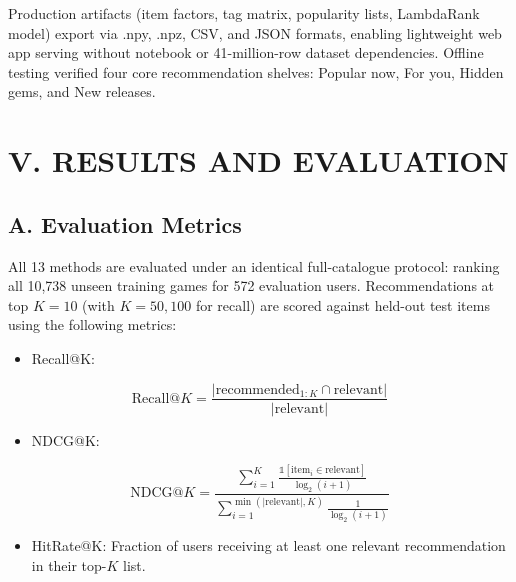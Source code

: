 \documentclass[conference]{IEEEtran}
\begin{document}
Production artifacts (item factors, tag matrix, popularity lists, LambdaRank model) export via .npy, .npz, CSV, and JSON formats, enabling lightweight web app serving without notebook or 41-million-row dataset dependencies. Offline testing verified four core recommendation shelves: Popular now, For you, Hidden gems, and New releases.

\section*{V. RESULTS AND EVALUATION}

\subsection*{A. Evaluation Metrics}

All 13 methods are evaluated under an identical full-catalogue protocol: ranking all 10,738 unseen training games for 572 evaluation users. Recommendations at top $K=10$ (with $K=50, 100$ for recall) are scored against held-out test items using the following metrics:

\begin{itemize}

\item Recall@K:

\end{itemize}

\begin{equation}
\mathrm{Recall}@K = \frac{\vert \mathrm{recommended}_{1:K} \cap \mathrm{relevant}\vert}{\vert \mathrm{relevant}\vert}
\end{equation}

\begin{itemize}

\item NDCG@K:

\end{itemize}

\begin{equation}
\mathrm{NDCG}@K = \frac{\sum_{i=1}^K \frac{\mathbb{1}[\mathrm{item}_i \in \mathrm{relevant}]}{\log_2(i+1)}}{\sum_{i=1}^{\min(\vert\mathrm{relevant}\vert,K)} \frac{1}{\log_2(i+1)}}
\end{equation}

\begin{itemize}

\item HitRate@K: Fraction of users receiving at least one relevant recommendation in their top-$K$ list.

\end{itemize}
\end{document}
